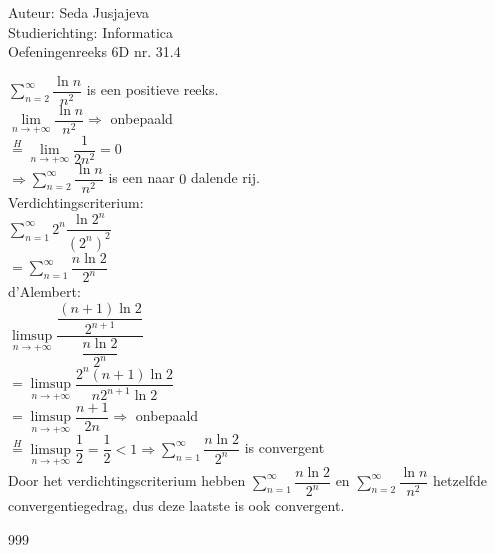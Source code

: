 \documentclass[a4paper]{article}
\newcommand{\limit}{\lim\limits}
\begin{document}
\noindent \large Auteur: Seda Jusjajeva\\
\noindent \large Studierichting: Informatica\\
\noindent \large Oefeningenreeks 6D nr. 31.4\\

\medskip

\normalsize


$\displaystyle\sum_{n = 2}^{\infty}\dfrac{\ln n}{n^2}$ is een positieve reeks. \\

$\limit_{n \to +\infty} \dfrac{\ln n}{n^2} \Rightarrow$ onbepaald \\

$\overset{H} = \limit_{n \to +\infty} \dfrac{1}{2n^2} = 0$ \\

$\Rightarrow\displaystyle\sum_{n = 2}^{\infty}\dfrac{\ln n}{n^2}$ is een naar $0$ dalende rij. \\

Verdichtingscriterium: \\

$\displaystyle\sum_{n = 1}^{\infty} 2^n\dfrac{\ln 2^n}{(2^n)^2}$ \\

$= \displaystyle\sum_{n = 1}^{\infty} \dfrac{n\ln 2}{2^n}$ \\

d'Alembert: \\

$\limsup\limits_{n \to +\infty} \dfrac{\dfrac{(n + 1)\ln 2}{2^{n + 1}}}{\dfrac{n\ln 2}{2^n}}$ \\

$= \limsup\limits_{n \to +\infty} \dfrac{2^n(n + 1)\ln 2}{n2^{n + 1}\ln 2}$ \\

$= \limsup\limits_{n \to +\infty} \dfrac{n + 1}{2n} \Rightarrow$ onbepaald \\

$\overset{H} = \limsup\limits_{n \to +\infty} \dfrac{1}{2} = \dfrac{1}{2} < 1 \Rightarrow \displaystyle\sum_{n = 1}^{\infty} \dfrac{n\ln 2}{2^n}$ is convergent \\

Door het verdichtingscriterium hebben $\displaystyle\sum_{n = 1}^{\infty} \dfrac{n\ln 2}{2^n}$ en $\displaystyle\sum_{n = 2}^{\infty}\dfrac{\ln n}{n^2}$ hetzelfde convergentiegedrag, dus deze laatste is ook convergent.





\begin{thebibliography}{999}
\end{thebibliography}
\end{document}
